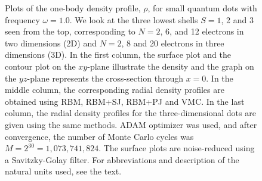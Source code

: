 \begin{figure}[H]
	\hspace{0.1cm}
	\hspace{-0.0cm}
	\hspace{-0.5cm}
	
	\caption{Plots of the one-body density profile, $\rho$, for small quantum dots with frequency $\omega=1.0$. We look at the three lowest shells $S=1$, 2 and 3 seen from the top, corresponding to $N=2$, 6, and 12 electrons in two dimensions (2D) and $N=2$, 8 and 20 electrons in three dimensions (3D). In the first column, the surface plot and the contour plot on the $xy$-plane illustrate the density and the graph on the $yz$-plane represents the cross-section through $x=0$. In the middle column, the corresponding radial density profiles are obtained using RBM, RBM+SJ, RBM+PJ and VMC. In the last column, the radial density profiles for the three-dimensional dots are given using the same methods. ADAM optimizer was used, and after convergence, the number of Monte Carlo cycles was $M=2^{30}=1,073,741,824$. The surface plots are noise-reduced using a Savitzky-Golay filter. For  abbreviations and description of the natural units used, see the text.}
	\label{fig:OB_interaction_23D}
\end{figure}
